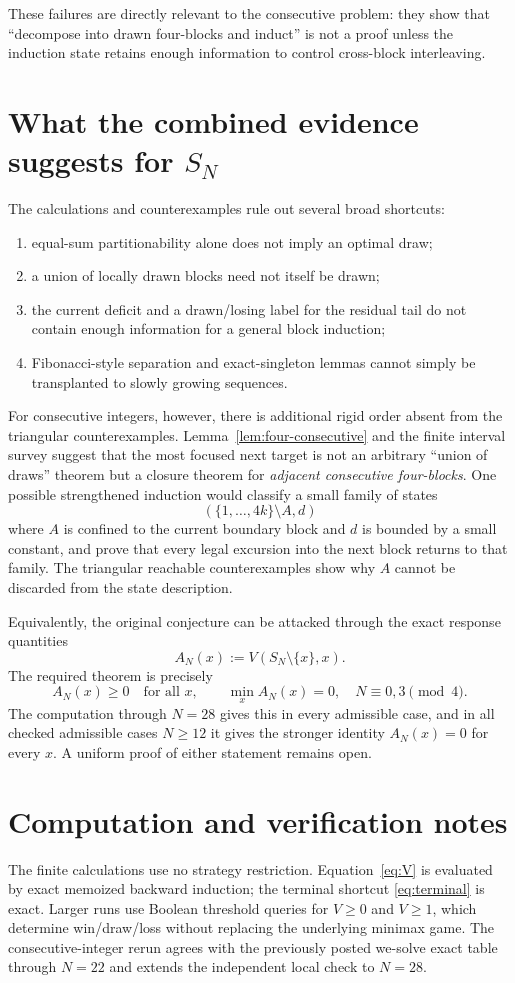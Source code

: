 \documentclass[11pt]{article}
\theoremstyle{remark}
\begin{document}
These failures are directly relevant to the consecutive problem: they show
that ``decompose into drawn four-blocks and induct'' is not a proof unless the
induction state retains enough information to control cross-block
interleaving.

\section{What the combined evidence suggests for $S_N$}
The calculations and counterexamples rule out several broad shortcuts:
\begin{enumerate}
\item equal-sum partitionability alone does not imply an optimal draw;
\item a union of locally drawn blocks need not itself be drawn;
\item the current deficit and a drawn/losing label for the residual tail do
      not contain enough information for a general block induction;
\item Fibonacci-style separation and exact-singleton lemmas cannot simply be
      transplanted to slowly growing sequences.
\end{enumerate}

For consecutive integers, however, there is additional rigid order absent
from the triangular counterexamples.  Lemma~\ref{lem:four-consecutive} and
the finite interval survey suggest that the most focused next target is not
an arbitrary ``union of draws'' theorem but a closure theorem for
\emph{adjacent consecutive four-blocks}.  One possible strengthened induction
would classify a small family of states
\[
(\{1,\ldots,4k\}\setminus A,d)
\]
where $A$ is confined to the current boundary block and $d$ is bounded by a
small constant, and prove that every legal excursion into the next block
returns to that family.  The triangular reachable counterexamples show why
$A$ cannot be discarded from the state description.

Equivalently, the original conjecture can be attacked through the exact
response quantities
\[
A_N(x):=V(S_N\setminus\{x\},x).
\]
The required theorem is precisely
\[
A_N(x)\ge0\quad\text{for all }x,
\qquad
\min_xA_N(x)=0,
\quad N\equiv0,3\pmod4.
\]
The computation through $N=28$ gives this in every admissible case, and in
all checked admissible cases $N\ge12$ it gives the stronger identity
$A_N(x)=0$ for every $x$.  A uniform proof of either statement remains open.

\section{Computation and verification notes}
The finite calculations use no strategy restriction.  Equation~\eqref{eq:V}
is evaluated by exact memoized backward induction; the terminal shortcut
\eqref{eq:terminal} is exact.  Larger runs use Boolean threshold queries for
$V\ge0$ and $V\ge1$, which determine win/draw/loss without replacing the
underlying minimax game.  The consecutive-integer rerun agrees with the
previously posted we-solve exact table through $N=22$ and extends the
independent local check to $N=28$.
\end{document}
